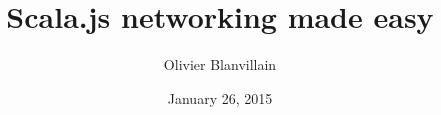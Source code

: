 \documentclass[14pt]{beamer}
\title{Scala.js networking made easy}
\author{Olivier Blanvillain}
\institute{Programming Methods Laboratory, EPFL}
\date{January 26, 2015}
\begin{document}
  \frame{\titlepage} 
  
\end{document}
